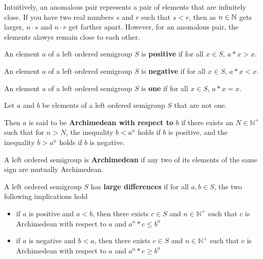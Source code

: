 Intuitively, an anomalous pair represents a pair
of elements that are infinitely close.
If you have two real numbers $s$ and $r$ such that $s < r$,
then as $n \in \mathbb{N}$ gets larger, $n\cdot s$ and $n\cdot r$
get farther apart. However, for an anomalous pair,
the elements alawys remain close to each other.

\begin{definition}\label{def:positive}\leanok
{}
An element $a$ of a left ordered semigroup $S$ is \textbf{positive} if for all $x\in S$, $a*x > x$.
\end{definition}

\begin{definition}\label{def:negative}\leanok
{}
An element $a$ of a left ordered semigroup $S$
is \textbf{negative} if for all $x\in S$, $a*x < x$.
\end{definition}

\begin{definition}\label{def:one}\leanok
{}
An element $a$ of a left ordered semigroup $S$
is \textbf{one} if for all $x\in S$, $a*x = x$.
\end{definition}

\begin{definition}\label{def:arch_wrt}\leanok
{}
Let $a$ and $b$ be elements of a left ordered semigroup $S$ that are not one.

Then $a$ is said to be \textbf{Archimedean with respect to} $b$
if there exists an $N\in \mathbb{N}^+$ such that for $n > N$,
the inequality $b < a^n$ holds if $b$ is positive,
and the inequality $b > a^n$ holds if $b$ is negative.
\end{definition}

\begin{definition}\label{def:arch}\leanok
{}
A left ordered semigroup is \textbf{Archimedean} if any two of its elements
of the same sign are mutually Archimedean.
\end{definition}

\begin{definition}\label{def:has_large_differences}\leanok
A left ordered semigroup $S$ has \textbf{large differences} if
for all $a,b\in S$, the two following implications hold
\begin{itemize}
\item if $a$ is positive and $a<b$, then there exists $c\in S$
and $n\in \mathbb{N}^+$ such that $c$ is Archimedean with respect to $a$
and $a^n*c \le b^n$
\item if $a$ is negative and $b < a$, then there exists $c\in S$
and $n\in \mathbb{N}^+$ such that $c$ is Archimedean with respect to $a$
and $a^n*c \ge b^n$
\end{itemize}
\end{definition}

